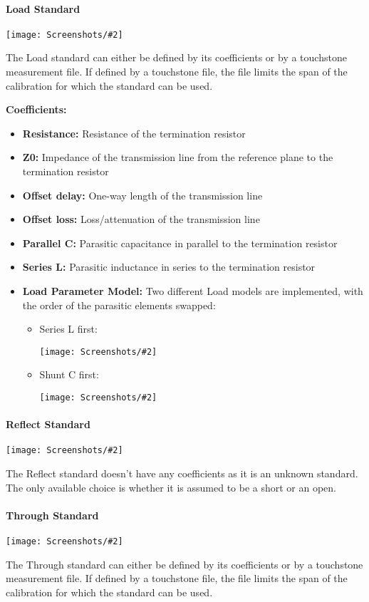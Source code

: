 \documentclass[a4paper,11pt]{article}
\newcommand{\screenshot}[2]{\begin{center}
\texttt{[image: Screenshots/\#2]}
\end{center}}
\begin{document}
\paragraph{Load Standard}
\screenshot{0.5}{LoadStandardDialog.png}
The Load standard can either be defined by its coefficients or by a touchstone measurement file. If defined by a touchstone file, the file limits the span of the calibration for which the standard can be used.

\textbf{Coefficients:}
\begin{itemize}
\item \textbf{Resistance:} Resistance of the termination resistor
\item \textbf{Z0:} Impedance of the transmission line from the reference plane to the termination resistor
\item \textbf{Offset delay:} One-way length of the transmission line
\item \textbf{Offset loss:} Loss/attenuation of the transmission line
\item \textbf{Parallel C:} Parasitic capacitance in parallel to the termination resistor
\item \textbf{Series L:} Parasitic inductance in series to the termination resistor
\item \textbf{Load Parameter Model:} Two different Load models are implemented, with the order of the parasitic elements swapped:
\begin{itemize}
\item Series L first: \screenshot{0.8}{Lfirst.pdf}
\item Shunt C first: \screenshot{0.6}{Cfirst.pdf}
\end{itemize}
\end{itemize}

\paragraph{Reflect Standard}
\screenshot{0.5}{ReflectStandardDialog.png}
The Reflect standard doesn't have any coefficients as it is an unknown standard. The only available choice is whether it is assumed to be a short or an open.

\paragraph{Through Standard}
\screenshot{0.5}{ThroughStandardDialog.png}
The Through standard can either be defined by its coefficients or by a touchstone measurement file. If defined by a touchstone file, the file limits the span of the calibration for which the standard can be used.
\end{document}
